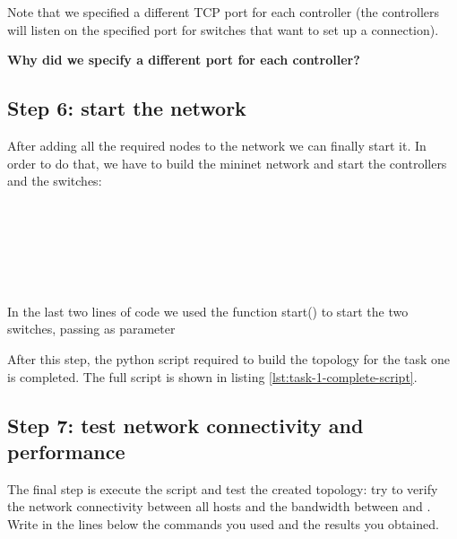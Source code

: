 Note that we specified a different TCP port for each controller (the controllers
will listen on the specified port for switches that want to set up a connection).

\textbf{Why did we specify a different port for each controller?}

\hrulefill

\hrulefill


\subsection*{Step 6: start the network}
After adding all the required nodes to the network we can finally start it. In order
to do that, we have to build the mininet network and start the controllers and the
switches:

 \\
 \\
 \\
 \\
 \\

In the last two lines of code we used the function start() to start the two switches,
passing as parameter

After this step, the python script required to build the topology for the task one
is completed. The full script is shown in listing \ref{lst:task-1-complete-script}.



\subsection{Step 7: test network connectivity and performance}
The final step is execute the script and test the created topology: try to verify
the network connectivity between all hosts and the bandwidth between  and .
Write in the lines below the commands you used and the results you obtained.

\hrulefill

\hrulefill

\hrulefill

